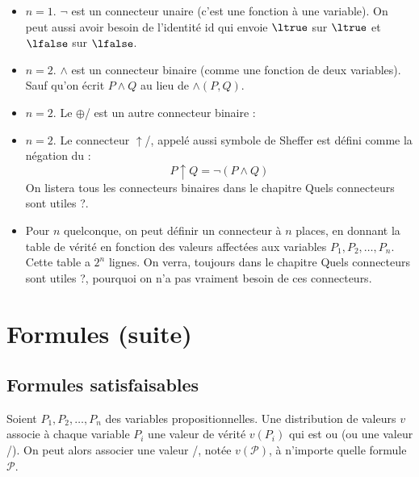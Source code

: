 \documentclass[11pt,class=report,crop=false]{standalone}
\begin{document}
\begin{itemize}
	\item $n=1$. $\lnot$ est un connecteur unaire (c'est une fonction à une variable). On peut aussi avoir besoin de l'identité $\mathrm{id}$ qui envoie $\ltrue$ sur $\ltrue$ et $\lfalse$ sur $\lfalse$.
	
	\item $n=2$. $\land$ est un connecteur binaire (comme une fonction de deux variables). Sauf qu'on écrit $P \land Q$ au lieu de $\land(P, Q)$.
	
	\item $n=2$. Le  $\oplus$/ est un autre connecteur binaire :
	
	\item $n=2$. Le connecteur $\uparrow$/, appelé aussi symbole de Sheffer est défini comme la négation du \tand :
	\[ P \uparrow Q = \lnot (P \land Q) \]
	On listera tous les connecteurs binaires dans le chapitre \og{}Quels connecteurs sont utiles ?\fg.
	
	\item Pour $n$ quelconque, on peut définir un connecteur à $n$ places, en donnant la table de vérité en fonction des valeurs affectées aux variables $P_1,P_2,\ldots, P_n$. Cette table a $2^n$ lignes.
	On verra, toujours dans le chapitre \og{}Quels connecteurs sont utiles ?\fg{}, pourquoi on n'a pas vraiment besoin de ces connecteurs.
\end{itemize}



\section{Formules (suite)}
\label{sec:formulesbis}

\subsection{Formules satisfaisables}

Soient $P_1, P_2,\ldots, P_n$ des variables propositionnelles.
Une distribution de valeurs $v$ associe à chaque variable $P_i$ une valeur de vérité $v(P_i)$ qui est \ltrue{} ou \lfalse{} (ou une valeur \lzero/\lone).
On peut alors associer une valeur \ltrue/\lfalse, notée $v(\mathcal{P})$, à n'importe quelle formule $\mathcal{P}$.
\end{document}
